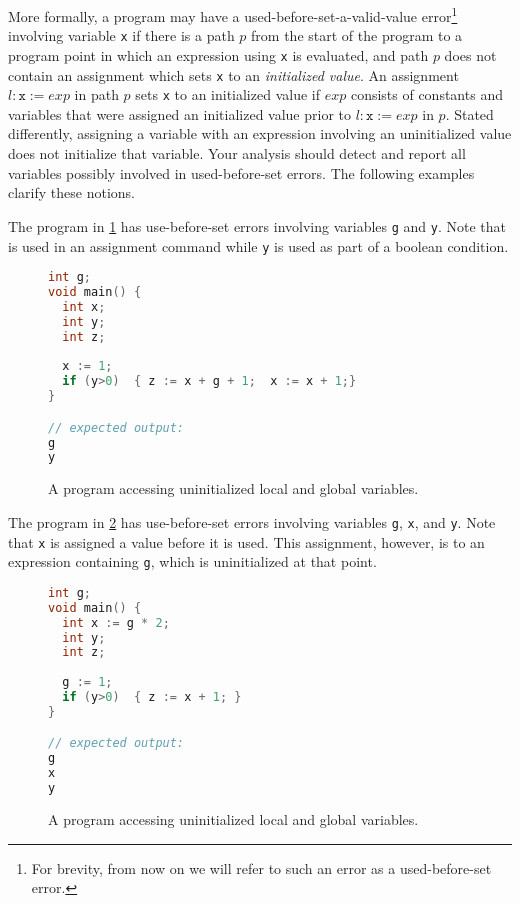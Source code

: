 \documentclass{article}
\begin{document}
More formally, a program may have a used-before-set-a-valid-value error\footnote{For brevity, from now on we will refer to such an error as a used-before-set error.} involving variable \texttt{x} if there is a path $p$ from the start of the program to a program point in which an expression using \texttt{x} is evaluated, and path $p$ does not contain an assignment which sets \texttt{x} to an \emph{initialized value}. An assignment $l: \texttt{x} := exp$ in path $p$ sets \texttt{x} to an initialized value if $exp$ consists of constants and variables that were assigned an initialized value prior to $l: \texttt{x} := exp$ in $p$.
Stated differently, assigning a variable with an expression involving an uninitialized value does not initialize that variable.
Your analysis should detect and report all variables possibly involved in used-before-set errors. The following examples clarify these notions. 

The program in \cref{fig:example-immediate} has use-before-set errors involving variables
\texttt{g} and \texttt{y}.
Note that  is used in an assignment command while \texttt{y} is used as part of a boolean condition.

\begin{figure}
\centering
\begin{lstlisting}[language=C]
int g;
void main() {
  int x;
  int y;
  int z;
  
  x := 1;
  if (y>0)  { z := x + g + 1;  x := x + 1;}
}

// expected output:
g
y
\end{lstlisting}
\caption{A program accessing uninitialized local and global variables.}
\label{fig:example-immediate}
\end{figure} 

The program in \cref{fig:example-flow} has use-before-set errors involving variables
\texttt{g}, \texttt{x}, and \texttt{y}.
Note that \texttt{x} is assigned a value before it is used. 
This assignment, however, is to an expression containing \texttt{g}, which is uninitialized at that point. 

\begin{figure}
\centering
\begin{lstlisting}[language=C]
int g;
void main() {
  int x := g * 2;
  int y;
  int z;
  
  g := 1;
  if (y>0)  { z := x + 1; }
}

// expected output:
g
x
y
\end{lstlisting}
\caption{A program accessing uninitialized local and global variables.}
\label{fig:example-flow}
\end{figure} 
 
\end{document}
